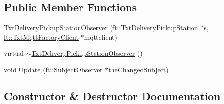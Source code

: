\subsection*{Public Member Functions}
\begin{DoxyCompactItemize}
\item 
\hyperlink{classft_1_1_txt_delivery_pickup_station_observer_a1d5b30b54ab8f3368b97be5688daf03a}{Txt\+Delivery\+Pickup\+Station\+Observer} (\hyperlink{classft_1_1_txt_delivery_pickup_station}{ft\+::\+Txt\+Delivery\+Pickup\+Station} $\ast$s, \hyperlink{classft_1_1_txt_mqtt_factory_client}{ft\+::\+Txt\+Mqtt\+Factory\+Client} $\ast$mqttclient)
\item 
virtual \hyperlink{classft_1_1_txt_delivery_pickup_station_observer_a80913e3aef8fee4a1e8bcb9eeb46915d}{$\sim$\+Txt\+Delivery\+Pickup\+Station\+Observer} ()
\item 
void \hyperlink{classft_1_1_txt_delivery_pickup_station_observer_a2525d061949c0b3c282b485c7ee0592b}{Update} (\hyperlink{classft_1_1_subject_observer}{ft\+::\+Subject\+Observer} $\ast$the\+Changed\+Subject)
\end{DoxyCompactItemize}


\subsection{Constructor \& Destructor Documentation}
